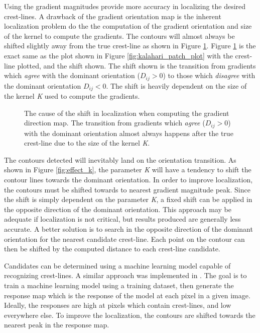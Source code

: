 Using the gradient magnitudes provide more accuracy in localizing the desired crest-lines. A drawback of the gradient orientation map is the inherent localization problem do the the computation of the gradient orientation and size of the kernel to compute the gradients. The contours will almost always be shifted slightly away from the true crest-line as shown in Figure \ref{fig:orientation_transition_shift}. Figure \ref{fig:orientation_transition_shift} is the exact same as the plot shown in Figure \ref{fig:kalahari_patch_plot} with the crest-line plotted, and the shift shown. The shift shown is the transition from gradients which \emph{agree} with the dominant orientation ($D_{ij} > 0$) to those which \emph{disagree} with the dominant orientation {$D_{ij} < 0$}. The shift is heavily dependent on the size of the kernel \emph{K} used to compute the gradients.

\begin{figure}
	\centering
	\caption{The cause of the shift in localization when computing the gradient direction map. The transition from gradients which \emph{agree} ($D_{ij} > 0$) with the dominant orientation almost always happens after the true crest-line due to the size of the kernel \emph{K}.}
	\label{fig:orientation_transition_shift}
\end{figure}

The contours detected will inevitably land on the orientation transition. As shown in Figure \ref{fig:effect_k}, the parameter \emph{K} will have a tendency to shift the contour lines towards the dominant orientation. In order to improve localization, the contours must be shifted towards to nearest gradient magnitude peak. Since the shift is simply dependent on the parameter \emph{K}, a fixed shift can be applied in the opposite direction of the dominant orientation. This approach may be adequate if localization is not critical, but results produced are generally less accurate. A better solution is to search in the opposite direction of the dominant orientation for the nearest candidate crest-line. Each point on the contour can then be shifted by the computed distance to each crest-line candidate.

Candidates can be determined using a machine learning model capable of recognizing crest-lines. A similar approach was implemented in \cite{2006_automated_classification_landform_elements,2007_Machine_Learning_tools_automatic_mapping_mars,2013_sar_image_automated_detection_dune_area,BandeiraMarques,2011_neural_network_based_dunal_landform_mapping,vaz_object_based_dune_analysis}. The goal is to train a machine learning model using a training dataset, then generate the response map which is the response of the model at each pixel in a given image. Ideally, the responses are high at pixels which contain crest-lines, and low everywhere else. To improve the localization, the contours are shifted towards the nearest peak in the response map.

